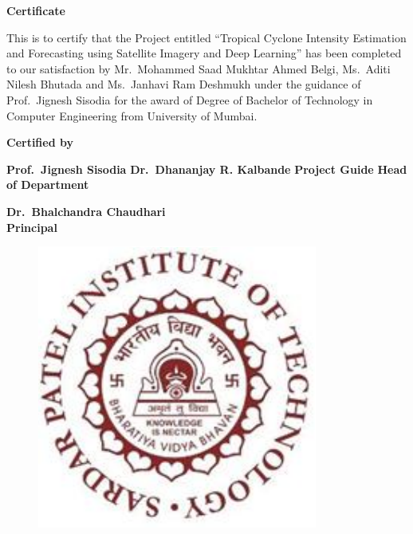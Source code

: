 \thispagestyle{empty}
\vspace*{0.2cm}
\vspace{1cm}
\begin{center}
\large\textbf{Certificate}
\end{center}
\vspace{1cm}
This is to certify that the Project entitled ``Tropical Cyclone Intensity Estimation and Forecasting using Satellite Imagery and Deep Learning'' has been completed to our
satisfaction by Mr.\ Mohammed Saad Mukhtar Ahmed Belgi, Ms.\ Aditi Nilesh Bhutada and Ms.\ Janhavi Ram Deshmukh  under the guidance of Prof.\ Jignesh Sisodia for the award of Degree of Bachelor of Technology in Computer Engineering from University of Mumbai.\\
\vspace{1cm}
\begin{center}
\textbf{Certified by}
\end{center}
\vspace{1cm}


\textbf {Prof.\ Jignesh Sisodia}
\hspace{2.0in}\textbf  {Dr.\ Dhananjay R. Kalbande}
\newline
\hspace*{0.5cm}
\textbf {Project Guide} \hspace{2.4in} \textbf{Head of Department} \\
\vspace{1cm}
 

\begin{center}
\textbf{Dr.\ Bhalchandra Chaudhari}\\
\textbf{Principal}
\end{center}
 
\begin{figure}[h]
\centering
\includegraphics[scale=0.8]{spitlogo.pdf}

\end{figure}
\hspace{.05cm}
\hspace{.05cm}
 
